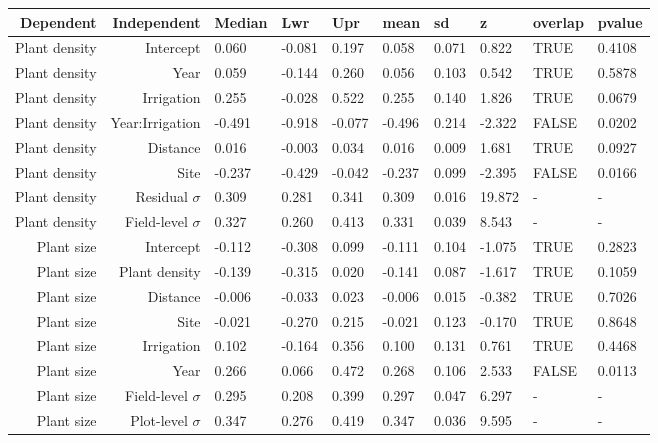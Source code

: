 \begin{landscape}
\begin{longtable}{|r|r|l|l|l|l|l|l|l|l|}
\hline 
  Dependent & Independent & Median & Lwr & Upr & mean & sd & z & overlap & pvalue \\ 
  \hline %
  Plant density & Intercept & 0.060 & -0.081 & 0.197 & 0.058 & 0.071 & 0.822 & TRUE & 0.4108 \\ 
  Plant density & Year & 0.059 & -0.144 & 0.260 & 0.056 & 0.103 & 0.542 & TRUE & 0.5878 \\ 
  Plant density & Irrigation & 0.255 & -0.028 & 0.522 & 0.255 & 0.140 & 1.826 & TRUE & 0.0679 \\ 
  Plant density & Year:Irrigation & -0.491 & -0.918 & -0.077 & -0.496 & 0.214 & -2.322 & FALSE & 0.0202 \\ 
  Plant density & Distance & 0.016 & -0.003 & 0.034 & 0.016 & 0.009 & 1.681 & TRUE & 0.0927 \\ 
  Plant density & Site & -0.237 & -0.429 & -0.042 & -0.237 & 0.099 & -2.395 & FALSE & 0.0166 \\ 
  Plant density & Residual $\sigma$ & 0.309 & 0.281 & 0.341 & 0.309 & 0.016 & 19.872 & - & - \\ 
  Plant density & Field-level $\sigma$ & 0.327 & 0.260 & 0.413 & 0.331 & 0.039 & 8.543 & - & - \\
  \hline %
  Plant size & Intercept & -0.112 & -0.308 & 0.099 & -0.111 & 0.104 & -1.075 & TRUE & 0.2823 \\ 
  Plant size & Plant density & -0.139 & -0.315 & 0.020 & -0.141 & 0.087 & -1.617 & TRUE & 0.1059 \\ 
  Plant size & Distance & -0.006 & -0.033 & 0.023 & -0.006 & 0.015 & -0.382 & TRUE & 0.7026 \\ 
  Plant size & Site & -0.021 & -0.270 & 0.215 & -0.021 & 0.123 & -0.170 & TRUE & 0.8648 \\ 
  Plant size & Irrigation & 0.102 & -0.164 & 0.356 & 0.100 & 0.131 & 0.761 & TRUE & 0.4468 \\ 
  Plant size & Year & 0.266 & 0.066 & 0.472 & 0.268 & 0.106 & 2.533 & FALSE & 0.0113 \\ 
  Plant size & Field-level $\sigma$ & 0.295 & 0.208 & 0.399 & 0.297 & 0.047 & 6.297 & - & - \\ 
  Plant size & Plot-level $\sigma$ & 0.347 & 0.276 & 0.419 & 0.347 & 0.036 & 9.595 & - & - \\ 

\end{longtable}
\end{landscape}
